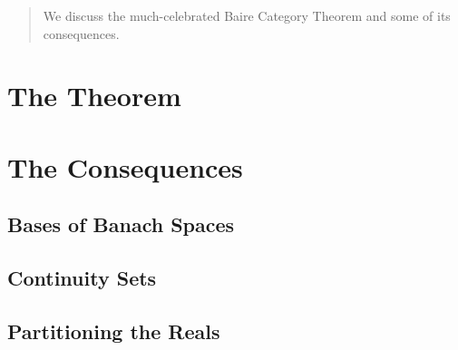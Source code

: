\documentclass[10pt]{mypackage}
\begin{document}
\RaggedRight
\begin{abstract}
  \noindent We discuss the much-celebrated Baire Category Theorem and some of its consequences.
\end{abstract}
\section{The Theorem}%
\section{The Consequences}%
\subsection{Bases of Banach Spaces}%
\subsection{Continuity Sets}%
\subsection{Partitioning the Reals}%
\end{document}
